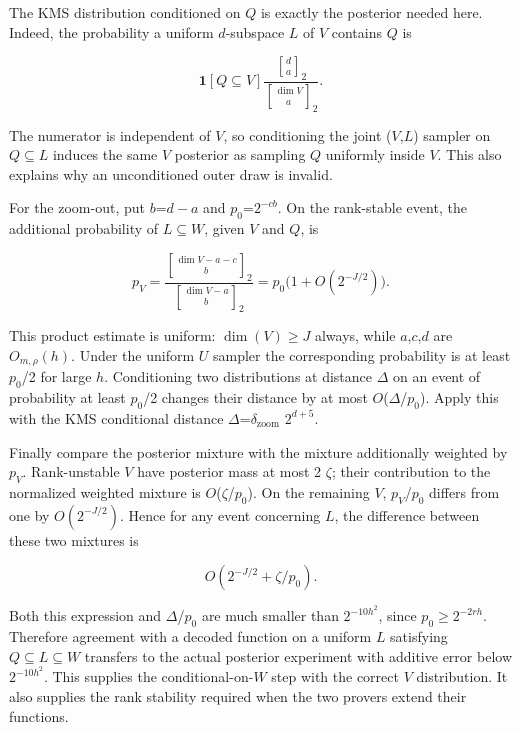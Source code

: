 The KMS distribution conditioned on \(Q\) is exactly the posterior needed here. Indeed, the probability a uniform \(d\)-subspace \(L\) of \(V\) contains \(Q\) is

\begin{equation}\label{eq:13}
\mathbf1[Q\subseteq V]\frac{\genfrac{[}{]}{0pt}{}{d}{a}_2}{\genfrac{[}{]}{0pt}{}{\dim V}{a}_2}.
\end{equation}

The numerator is independent of \(V\), so conditioning the joint (\(V\),\(L\)) sampler on \(Q\subseteq L\) induces the same \(V\) posterior as sampling \(Q\) uniformly inside \(V\). This also explains why an unconditioned outer draw is invalid.

For the zoom-out, put \(b\)=\(d-a\) and \(p_0\)=\(2^{-cb}\). On the rank-stable event, the additional probability of \(L\subseteq W\), given \(V\) and \(Q\), is

\begin{equation}\label{eq:14}
p_V=\frac{\genfrac{[}{]}{0pt}{}{\dim V-a-c}{b}_2}{\genfrac{[}{]}{0pt}{}{\dim V-a}{b}_2}=p_0\bigl(1+O(2^{-J/2})\bigr).
\end{equation}

This product estimate is uniform: \(\dim(V)\)\(\ge\)\(J\) always, while \(a\),\(c\),\(d\) are \(O_{m,\rho}(h)\). Under the uniform \(U\) sampler the corresponding probability is at least \(p_0\)/2 for large \(h\). Conditioning two distributions at distance \(\Delta\) on an event of probability at least \(p_0\)/2 changes their distance by at most \(O\)(\(\Delta\)/\(p_0\)). Apply this with the KMS conditional distance \(\Delta\)=\(\delta_{\mathrm{zoom}}\) \(2^{d+5}\).

Finally compare the posterior mixture with the mixture additionally weighted by \(p_V\). Rank-unstable \(V\) have posterior mass at most 2 \(\zeta\); their contribution to the normalized weighted mixture is \(O\)(\(\zeta\)/\(p_0\)). On the remaining \(V\), \(p_V\)/\(p_0\) differs from one by \(O(2^{-J/2})\). Hence for any event concerning \(L\), the difference between these two mixtures is

\begin{equation}\label{eq:15}
O(2^{-J/2}+\zeta/p_0).
\end{equation}

Both this expression and \(\Delta\)/\(p_0\) are much smaller than \(2^{-10h^2}\), since \(p_0\)\(\ge\)\(2^{-2rh}\). Therefore agreement with a decoded function on a uniform \(L\) satisfying \(Q\subseteq L\subseteq W\) transfers to the actual posterior experiment with additive error below \(2^{-10h^2}\). This supplies the conditional-on-\(W\) step with the correct \(V\) distribution. It also supplies the rank stability required when the two provers extend their functions.

